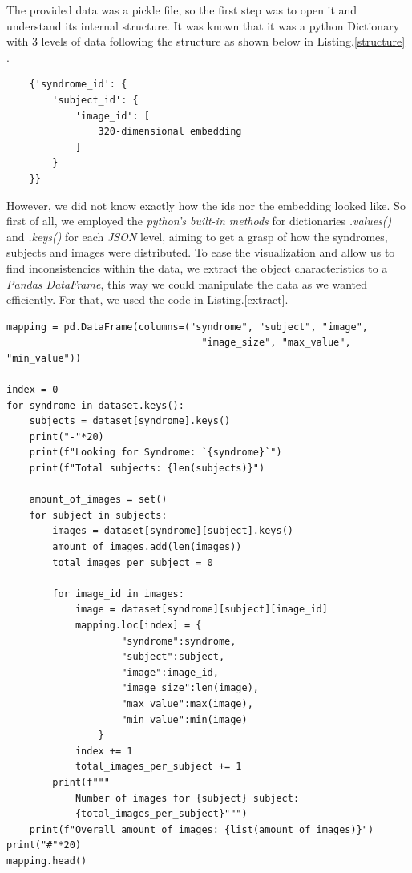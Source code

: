 \documentclass{article}
\begin{document}
The provided data was a pickle file, so the first step was to open it and understand its internal structure. It was known that it was a python Dictionary with $3$ levels of data following the structure as shown below in Listing.\ref{structure} .

\newpage
\begin{listing}[H]
	\centering
	\begin{verbatim} 
	{'syndrome_id': {
		'subject_id': {
			'image_id': [
				320-dimensional embedding
			]
		}
	}}
	\end{verbatim}
	\caption{The pickle structure.}
	\label{structure}
\end{listing}

However, we did not know exactly how the ids nor the embedding looked like. So first of all, we employed the \textit{python's built-in methods} for dictionaries \textit{.values()} and \textit{.keys()} for each \textit{JSON} level, aiming to get a grasp of how the syndromes, subjects and images were distributed. To ease the visualization and allow us to find inconsistencies within the data, we extract the object characteristics to a \textit{Pandas DataFrame}, this way we could manipulate the data as we wanted efficiently. For that, we used the code in Listing.\ref{extract}.



 \newpage
 \begin{listing}[H]
 	\centering
	\begin{verbatim} 
mapping = pd.DataFrame(columns=("syndrome", "subject", "image", 
		                          "image_size", "max_value", "min_value"))
		
index = 0
for syndrome in dataset.keys():
	subjects = dataset[syndrome].keys()
	print("-"*20)
	print(f"Looking for Syndrome: `{syndrome}`")
	print(f"Total subjects: {len(subjects)}")
		
	amount_of_images = set()
	for subject in subjects:
		images = dataset[syndrome][subject].keys()
		amount_of_images.add(len(images))
		total_images_per_subject = 0
	
		for image_id in images:
			image = dataset[syndrome][subject][image_id]
			mapping.loc[index] = {
					"syndrome":syndrome, 
					"subject":subject, 
					"image":image_id, 
					"image_size":len(image), 
					"max_value":max(image), 
					"min_value":min(image)
				}
			index += 1
			total_images_per_subject += 1
		print(f"""
			Number of images for {subject} subject: 
			{total_images_per_subject}""")
	print(f"Overall amount of images: {list(amount_of_images)}")
print("#"*20)
mapping.head()
	\end{verbatim}

	\caption{\textit{Python} code for extracting dataset characteristics into a \textit{Pandas DataFrame}}
	\label{extract}
\end{listing}
\end{document}
